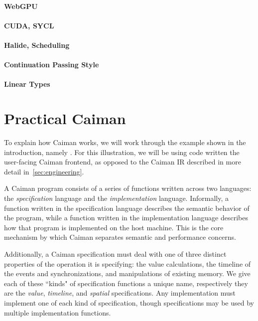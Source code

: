 \paragraph{WebGPU}

\paragraph{CUDA, SYCL}

\paragraph{Halide, Scheduling}

\paragraph{Continuation Passing Style}

\paragraph{Linear Types}

\section{Practical Caiman}
\label{sec:practical}

To explain how Caiman works, we will work through the example shown in the introduction, namely .  For this illustration, we will be using code written the user-facing Caiman frontend, as opposed to the Caiman IR described in more detail in~\ref{sec:engineering}.

A Caiman program consists of a series of functions written across two languages: the \textit{specification} language and the \textit{implementation} language.  Informally, a function written in the specification language describes the semantic behavior of the program, while a function written in the implementation language describes how that program is implemented on the host machine.  This is the core mechanism by which Caiman separates semantic and performance concerns.

Additionally, a Caiman specification must deal with one of three distinct properties of the operation it is specifying: the value calculations, the timeline of the events and synchronizations, and manipulations of existing memory.  We give each of these ``kinds" of specification functions a unique name, respectively they are the \textit{value}, \textit{timeline}, and \textit{spatial} specifications.  Any implementation must implement one of each kind of specification, though specifications may be used by multiple implementation functions.

